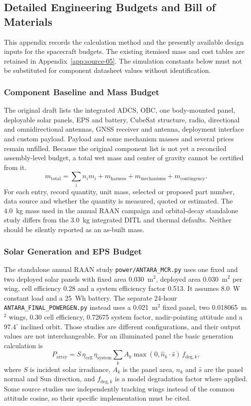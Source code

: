 
\subsection{Detailed Engineering Budgets and Bill of Materials}\label{app:detailed-budgets}
This appendix records the calculation method and the presently available design inputs for the spacecraft budgets. The existing itemised mass and cost tables are retained in Appendix~\ref{app:source-05}. The simulation constants below must not be substituted for component datasheet values without identification.
\subsubsection{Component Baseline and Mass Budget}\label{app:bom-baseline}
The original draft lists the integrated ADCS, OBC, one body-mounted panel, deployable solar panels, EPS and battery, CubeSat structure, radio, directional and omnidirectional antennas, GNSS receiver and antenna, deployment interface and custom payload. Payload and some mechanism masses and several prices remain unfilled. Because the original component list is not yet a reconciled assembly-level budget, a total wet mass and center of gravity cannot be certified from it.
\begin{equation}\label{eq:mass-budget}m_{\mathrm{total}}=\sum_i n_i m_i+m_{\mathrm{harness}}+m_{\mathrm{mechanisms}}+m_{\mathrm{contingency}}.\end{equation}
For each entry, record quantity, unit mass, selected or proposed part number, data source and whether the quantity is measured, quoted or estimated. The 4.0~kg mass used in the annual RAAN campaign and orbital-decay standalone study differs from the 3.0~kg integrated DITL and thermal defaults. Neither should be silently reported as an as-built mass.
\subsubsection{Solar Generation and EPS Budget}\label{app:eps-analysis}
The standalone annual RAAN study \texttt{power/ANTARA\_MCR.py} uses one fixed and two deployed solar panels with fixed area 0.030~m$^2$, deployed area 0.030~m$^2$ per wing, cell efficiency 0.28 and a system efficiency factor 0.513. It assumes 8.0~W constant load and a 25~Wh battery. The separate 24-hour \texttt{ANTARA\_FINAL\_POWERGEN.py} instead uses a 0.021~m$^2$ fixed panel, two 0.018065~m$^2$ wings, 0.30 cell efficiency, 0.72675 system factor, nadir-pointing attitude and a $97.4^\circ$ inclined orbit. Those studies are different configurations, and their output values are not interchangeable.
For an illuminated panel the basic generation calculation is
\begin{equation}\label{eq:solar-generation}P_{\mathrm{array}}=S\,\eta_{\mathrm{cell}}\,\eta_{\mathrm{system}}\sum_k A_k\max(0,\hat{n}_k\cdot\hat{s})\,f_{\mathrm{deg},k},\end{equation}
where $S$ is incident solar irradiance, $A_k$ is the panel area, $\hat n_k$ and $\hat s$ are the panel normal and Sun direction, and $f_{\mathrm{deg},k}$ is a model degradation factor where applied. Some source studies use independently tracking wings instead of the common attitude cosine, so their specific implementation must be cited.
